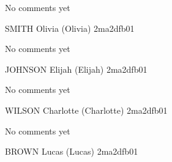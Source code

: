 \documentclass[11pt]{article}
\begin{document}
No comments yet

\newpage

SMITH Olivia (Olivia) \hfill 2ma2dfb01 \\

\noindent
\begin{minipage}[t]{0.49\textwidth}
\centering
{}
\end{minipage}
\hfill
\begin{minipage}[t]{0.49\textwidth}
\centering
{}
\end{minipage}

No comments yet

\newpage

JOHNSON Elijah (Elijah) \hfill 2ma2dfb01 \\

\noindent
\begin{minipage}[t]{0.49\textwidth}
\centering
{}
\end{minipage}
\hfill
\begin{minipage}[t]{0.49\textwidth}
\centering
{}
\end{minipage}

No comments yet

\newpage

WILSON Charlotte (Charlotte) \hfill 2ma2dfb01 \\

\noindent
\begin{minipage}[t]{0.49\textwidth}
\centering
{}
\end{minipage}
\hfill
\begin{minipage}[t]{0.49\textwidth}
\centering
{}
\end{minipage}

No comments yet

\newpage

BROWN Lucas (Lucas) \hfill 2ma2dfb01 \\

\noindent
\begin{minipage}[t]{0.49\textwidth}
\centering
{}
\end{minipage}
\hfill
\begin{minipage}[t]{0.49\textwidth}
\centering
{}
\end{minipage}
\end{document}

